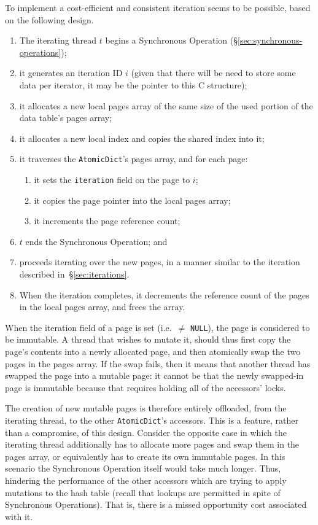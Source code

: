 To implement a cost-efficient and consistent iteration seems to be possible, based on the following design.

\begin{enumerate}
	\item The iterating thread $t$ begins a Synchronous Operation (\S\ref{sec:synchronous-operations});
	\item it generates an iteration ID $i$ (given that there will be need to store some data per iterator, it may be the pointer to this C structure);
	\item it allocates a new local pages array of the same size of the used portion of the data table's pages array;
	\item it allocates a new local index and copies the shared index into it;
	\item it traverses the \texttt{AtomicDict}'s pages array, and for each page:
	\begin{enumerate}
		\item it sets the \texttt{iteration} field on the page to $i$;
		\item it copies the page pointer into the local pages array;
		\item it increments the page reference count;
	\end{enumerate}
	\item $t$ ends the Synchronous Operation; and
	\item proceeds iterating over the new pages, in a manner similar to the iteration described in~\S\ref{sec:iterations}.
	\item When the iteration completes, it decrements the reference count of the pages in the local pages array, and frees the array.
\end{enumerate}

When the iteration field of a page is set (i.e.\ $\neq$ \texttt{NULL}), the page is considered to be immutable.
A thread that wishes to mutate it, should thus first copy the page's contents into a newly allocated page, and then atomically swap the two pages in the pages array.
If the swap fails, then it means that another thread has swapped the page into a mutable page: it cannot be that the newly swapped-in page is immutable because that requires holding all of the accessors' locks.

The creation of new mutable pages is therefore entirely offloaded, from the iterating thread, to the other \texttt{AtomicDict}'s accessors.
This is a feature, rather than a compromise, of this design.
Consider the opposite case in which the iterating thread additionally has to allocate more pages and swap them in the pages array, or equivalently has to create its own immutable pages.
In this scenario the Synchronous Operation itself would take much longer.
Thus, hindering the performance of the other accessors which are trying to apply mutations to the hash table (recall that lookups are permitted in spite of Synchronous Operations).
That is, there is a missed opportunity cost associated with it.

